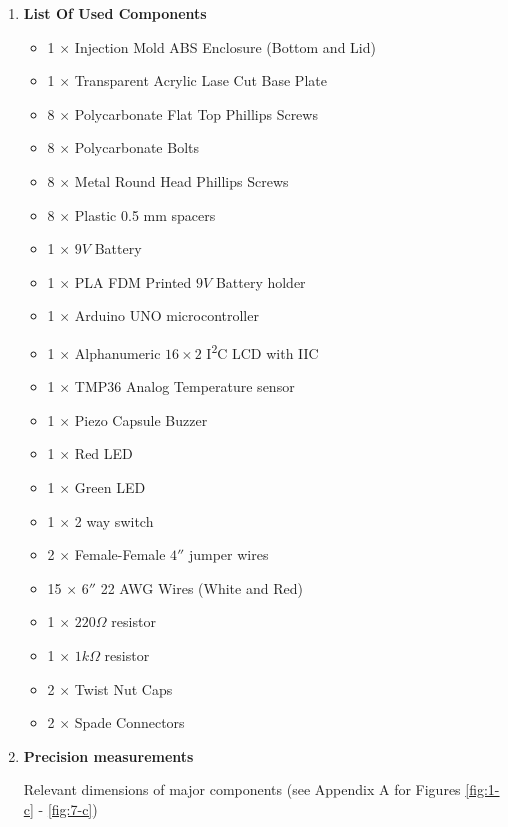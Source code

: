 \documentclass[10pt]{article}
\begin{document}
\begin{enumerate}[label=\Alph*.]
	\item \textbf{List Of Used Components}
	      \begin{multicols}{2}
		      \begin{itemize}
			      \item 1 $\times$ Injection Mold ABS Enclosure (Bottom and Lid)
			      \item 1 $\times$ Transparent Acrylic Lase Cut Base Plate
			      \item 8 $\times$ Polycarbonate Flat Top Phillips Screws
			      \item 8 $\times$ Polycarbonate Bolts
			      \item 8 $\times$ Metal Round Head Phillips Screws
			      \item 8 $\times$ Plastic 0.5 mm spacers
			      \item 1 $\times$ $9 V$ Battery
			      \item 1 $\times$ PLA FDM Printed $9 V$ Battery holder
			      \item 1 $\times$ Arduino UNO microcontroller
			      \item 1 $\times$ Alphanumeric $16 \times 2$ I\textsuperscript{2}C LCD with IIC
			      \item 1 $\times$ TMP36 Analog Temperature sensor
			      \item 1 $\times$ Piezo Capsule Buzzer
			      \item 1 $\times$ Red LED
			      \item 1 $\times$ Green LED
			      \item 1 $\times$ 2 way switch
			      \item 2 $\times$ Female-Female $4''$ jumper wires
			      \item 15 $\times$ $6''$ 22 AWG Wires (White and Red)
			      \item 1 $\times$ $220 \Omega$ resistor
			      \item 1 $\times$ $1 k\Omega$ resistor
			      \item 2 $\times$ Twist Nut Caps
			      \item 2 $\times$ Spade Connectors
		      \end{itemize}
	      \end{multicols}
	\item \textbf{Precision measurements}
	      \begin{table}[H]
		      \centering
		      \caption{Relevant dimensions of major components (see Appendix A for Figures \ref{fig:1-c} - \ref{fig:7-c})}

\end{table}
\end{enumerate}
\end{document}
